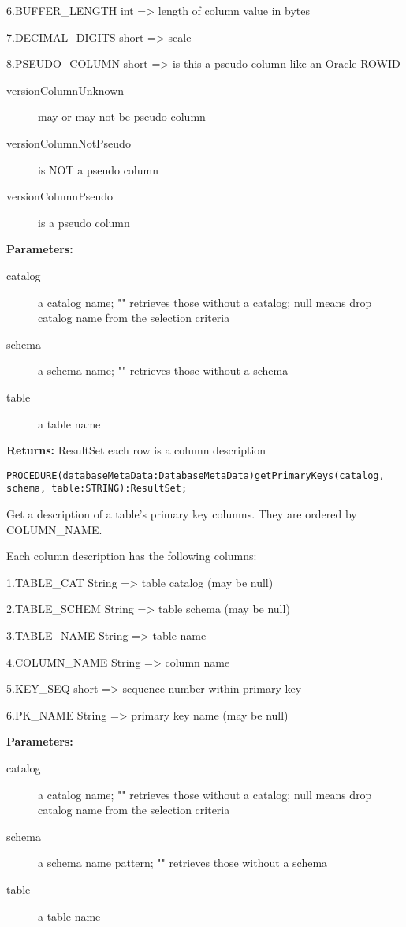 6.BUFFER\_LENGTH int => length of column value in bytes 

7.DECIMAL\_DIGITS short => scale 

8.PSEUDO\_COLUMN short => is this a pseudo column like an Oracle ROWID 
\begin{description}
\item[versionColumnUnknown] may or may not be pseudo column 
\item[versionColumnNotPseudo] is NOT a pseudo column 
\item[versionColumnPseudo] is a pseudo column 
\end{description}



{\bf Parameters: }
\begin{description}
\item[catalog] a catalog name; "" retrieves those without a catalog; null means drop catalog name from the selection criteria 
\item[schema] a schema name; "" retrieves those without a schema 
\item[table] a table name 
\end{description}

{\bf Returns: } 
ResultSet each row is a column description 




\verb'PROCEDURE(databaseMetaData:DatabaseMetaData)getPrimaryKeys(catalog, schema, table:STRING):ResultSet;'




Get a description of a table's primary key columns. They are ordered by COLUMN\_NAME. 

Each column description has the following columns: 

1.TABLE\_CAT String => table catalog (may be null) 

2.TABLE\_SCHEM String => table schema (may be null) 

3.TABLE\_NAME String => table name 

4.COLUMN\_NAME String => column name 

5.KEY\_SEQ short => sequence number within primary key 

6.PK\_NAME String => primary key name (may be null) 


{\bf Parameters: }
\begin{description}
\item[catalog] a catalog name; "" retrieves those without a catalog; null means drop catalog name from the selection criteria 
\item[schema] a schema name pattern; "" retrieves those without a schema 
\item[table] a table name 
\end{description}

